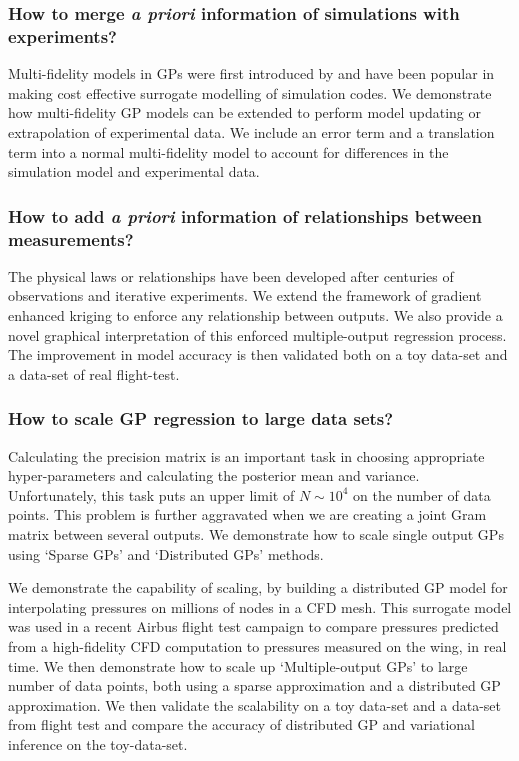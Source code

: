 \subsubsection*{How to merge \textit{a priori} information of simulations with experiments?}
Multi-fidelity models in GPs were first introduced by \cite{kennedy2000predicting} and have been popular in making cost effective surrogate modelling of simulation codes. We demonstrate how multi-fidelity GP models can be extended to perform model updating or extrapolation of experimental data. We include an error term and a translation term into a normal multi-fidelity model to account for differences in the simulation model and experimental data. 

\subsubsection*{How to add \textit{a priori} information of relationships between measurements?}
The physical laws or relationships have been developed after centuries of observations and iterative experiments. We extend the framework of gradient enhanced kriging to enforce any relationship between outputs. We also provide a novel graphical interpretation of this enforced multiple-output regression process. The improvement in model accuracy is then validated both on a toy data-set and a data-set of real flight-test.

\subsubsection*{How to scale GP regression to large data sets?}
Calculating the precision matrix is an important task in choosing appropriate hyper-parameters and calculating the posterior mean and variance. Unfortunately, this task puts an upper limit of $N \sim 10^4$ on the number of data points. This problem is further aggravated when we are creating a joint Gram matrix between several outputs. We demonstrate how to scale single output GPs using `Sparse GPs'  and `Distributed GPs' methods.

We demonstrate the capability of scaling, by building a distributed GP model for interpolating pressures on millions of nodes in a CFD mesh. This surrogate model was used in a recent Airbus flight test campaign to compare pressures predicted from a high-fidelity CFD computation to pressures measured on the wing, in real time. We then demonstrate how to scale up `Multiple-output GPs' to large number of data points, both using a sparse approximation and a distributed GP approximation. We then validate the scalability on a toy data-set and a data-set from flight test and compare the accuracy of distributed GP and variational inference on the toy-data-set. 


